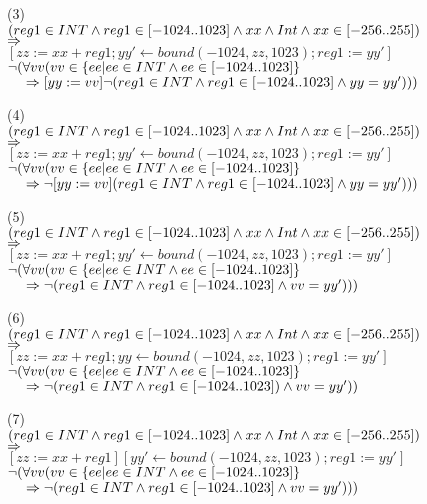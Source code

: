 \bigskip\noindent
(3)\\
$(reg1\in INT\et reg1\in[-1024..1023]\et xx\et Int\et xx\in[-256..255])$\\
$\fleche$\\
$[zz:=xx+reg1;yy'\longleftarrow bound(-1024, zz, 1023); reg1:=yy']$ \\
$\neg(\forall vv (vv\in \{ ee | ee\in INT \et ee\in [-1024..1023] \}$\\
$\tab{1em} \fleche [yy:=vv]\neg(reg1\in INT\et reg1\in[-1024..1023]\et yy = yy')))$

\bigskip\noindent
(4)\\
$(reg1\in INT\et reg1\in[-1024..1023]\et xx\et Int\et xx\in[-256..255])$\\
$\fleche$\\
$[zz:=xx+reg1;yy'\longleftarrow bound(-1024, zz, 1023); reg1:=yy']$ \\
$\neg(\forall vv (vv\in \{ ee | ee\in INT \et ee\in [-1024..1023] \}$\\
$\tab{1em}  \fleche \neg[yy:=vv](reg1\in INT\et reg1\in[-1024..1023]\et yy = yy')))$

\bigskip\noindent
(5)\\
$(reg1\in INT\et reg1\in[-1024..1023]\et xx\et Int\et xx\in[-256..255])$\\
$\fleche$\\
$[zz:=xx+reg1;yy'\longleftarrow bound(-1024, zz, 1023); reg1:=yy']$ \\
$\neg(\forall vv (vv\in \{ ee | ee\in INT \et ee\in [-1024..1023] \}$\\
$\tab{1em}  \fleche \neg(reg1\in INT\et reg1\in[-1024..1023]\et vv = yy')))$

\bigskip\noindent
(6)\\
$(reg1\in INT\et reg1\in[-1024..1023]\et xx\et Int\et xx\in[-256..255])$\\
$\fleche$\\
$[zz:=xx+reg1;yy\longleftarrow bound(-1024, zz, 1023); reg1:=yy']$ \\
$\neg(\forall vv (vv\in \{ ee | ee\in INT \et ee\in [-1024..1023] \}$\\
$\tab{1em} \fleche\neg(reg1\in INT\et reg1\in[-1024..1023])\et vv = yy'))$

\bigskip\noindent
(7)\\
$(reg1\in INT\et reg1\in[-1024..1023]\et xx\et Int\et xx\in[-256..255])$\\
$\fleche$\\
$[zz:=xx+reg1] [yy'\longleftarrow bound(-1024, zz, 1023); reg1:=yy']$ \\
$\neg(\forall vv (vv\in \{ ee | ee\in INT \et ee\in [-1024..1023] \}$\\
$\tab{1em} \fleche\neg(reg1\in INT\et reg1\in[-1024..1023]\et vv = yy')))$


